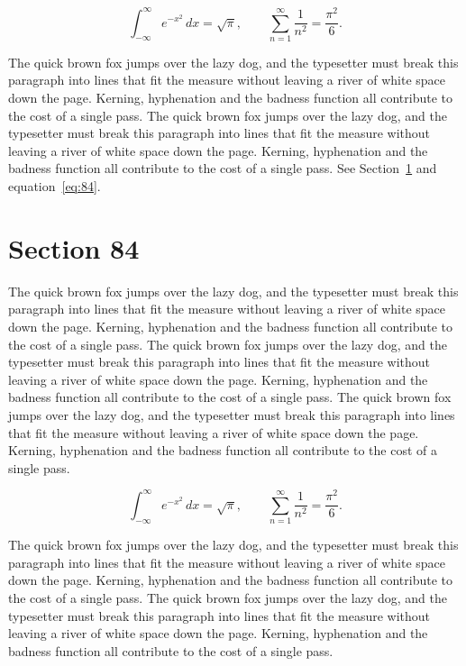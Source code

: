 \documentclass{article}
\begin{document}
\begin{equation}\label{eq:83}
\int_{-\infty}^{\infty} e^{-x^{2}}\,dx = \sqrt{\pi}, \qquad
\sum_{n=1}^{\infty} \frac{1}{n^{2}} = \frac{\pi^{2}}{6}.
\end{equation}

The quick brown fox jumps over the lazy dog, and the typesetter must break this paragraph into lines that fit the measure without leaving a river of white space down the page. Kerning, hyphenation and the badness function all contribute to the cost of a single pass. The quick brown fox jumps over the lazy dog, and the typesetter must break this paragraph into lines that fit the measure without leaving a river of white space down the page. Kerning, hyphenation and the badness function all contribute to the cost of a single pass. 
See Section~\ref{sec:84} and equation~\eqref{eq:84}.
\section{Section 84}
\label{sec:84}
The quick brown fox jumps over the lazy dog, and the typesetter must break this paragraph into lines that fit the measure without leaving a river of white space down the page. Kerning, hyphenation and the badness function all contribute to the cost of a single pass. The quick brown fox jumps over the lazy dog, and the typesetter must break this paragraph into lines that fit the measure without leaving a river of white space down the page. Kerning, hyphenation and the badness function all contribute to the cost of a single pass. The quick brown fox jumps over the lazy dog, and the typesetter must break this paragraph into lines that fit the measure without leaving a river of white space down the page. Kerning, hyphenation and the badness function all contribute to the cost of a single pass. 

\begin{equation}\label{eq:84}
\int_{-\infty}^{\infty} e^{-x^{2}}\,dx = \sqrt{\pi}, \qquad
\sum_{n=1}^{\infty} \frac{1}{n^{2}} = \frac{\pi^{2}}{6}.
\end{equation}

The quick brown fox jumps over the lazy dog, and the typesetter must break this paragraph into lines that fit the measure without leaving a river of white space down the page. Kerning, hyphenation and the badness function all contribute to the cost of a single pass. The quick brown fox jumps over the lazy dog, and the typesetter must break this paragraph into lines that fit the measure without leaving a river of white space down the page. Kerning, hyphenation and the badness function all contribute to the cost of a single pass. 
\end{document}
